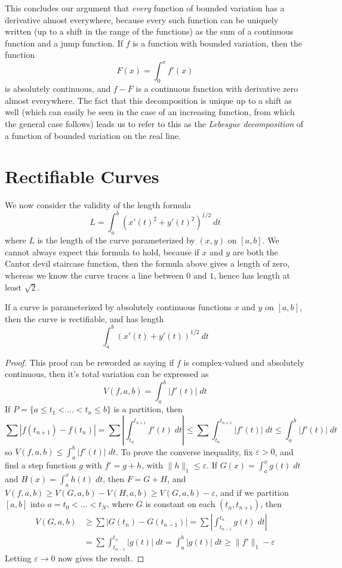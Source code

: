 This concludes our argument that {\it every} function of bounded variation has a derivative almost everywhere, because every such function can be uniquely written (up to a shift in the range of the functions) as the sum of a continuous function and a jump function. If $f$ is a function with bounded variation, then the function
%
\[ F(x) = \int_0^x f'(x) \]
%
is absolutely continuous, and $f - F$ is a continuous function with derivative zero almost everywhere. The fact that this decomposition is unique up to a shift as well (which can easily be seen in the case of an increasing function, from which the general case follows) leads us to refer to this as the \emph{Lebesgue decomposition} of a function of bounded variation on the real line.

\section{Rectifiable Curves}

We now consider the validity of the length formula
%
\[ L = \int_a^b (x'(t)^2 + y'(t)^2)^{1/2}\ dt \]
%
where $L$ is the length of the curve parameterized by $(x,y)$ on $[a,b]$. We cannot always expect this formula to hold, because if $x$ and $y$ are both the Cantor devil staircase function, then the formula above gives a length of zero, whereas we know the curve traces a line between $0$ and $1$, hence has length at least $\sqrt{2}$.

\begin{theorem}
    If a curve is parameterized by absolutely continuous functions $x$ and $y$ on $[a,b]$, then the curve is rectifiable, and has length
    \[ \int_a^b (x'(t) + y'(t))^{1/2}\ dt \]
\end{theorem}
\begin{proof}
  This proof can be reworded as saying if $f$ is complex-valued and absolutely continuous, then it's total variation can be expressed as
  \[ V(f,a,b) = \int_a^b |f'(t)|\; dt \]
  If $P = \{ a \leq t_1 < \dots < t_n \leq b \}$ is a partition, then
  \[ \sum |f(t_{n+1}) - f(t_n)| = \sum \left| \int_{t_n}^{t_{n+1}} f'(t)\; dt \right| \leq \sum \int_{t_n}^{t_{n+1}} |f'(t)|\; dt \leq \int_a^b |f'(t)|\; dt \]
  so $V(f,a,b) \leq \int_a^b |f'(t)|\; dt$. To prove the converse inequality, fix $\varepsilon > 0$, and find a step function $g$ with $f' = g + h$, with $\| h \|_1 \leq \varepsilon$. If $G(x) = \int_a^x g(t)\; dt$ and $H(x) = \int_a^x h(t)\; dt$, then $F = G + H$, and $V(f,a,b) \geq V(G,a,b) - V(H,a,b) \geq V(G,a,b) - \varepsilon$, and if we partition $[a,b]$ into $a = t_0 < \dots < t_N$, where $G$ is constant on each $(t_n, t_{n+1})$, then 
  \begin{align*}
    V(G,a,b) &\geq \sum |G(t_n) - G(t_{n-1})| = \sum \left| \int_{t_{n-1}}^{t_n} g(t)\; dt \right|\\
    &= \sum \int_{t_{n-1}}^{t_n} |g(t)|\; dt = \int_a^b |g(t)|\; dt \geq \| f' \|_1 - \varepsilon
  \end{align*}
  Letting $\varepsilon \to 0$ now gives the result.
\end{proof}

